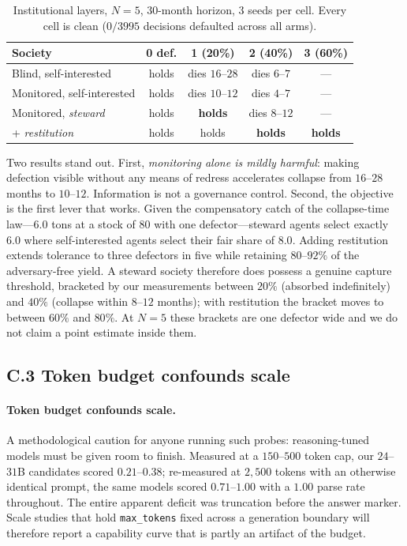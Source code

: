 \documentclass[11pt,a4paper]{article}
\begin{document}
\begin{table}[t]
\caption{Institutional layers, $N{=}5$, $30$-month horizon, 3 seeds per cell.
Every cell is clean ($0/3995$ decisions defaulted across all arms).}
\label{tab:arms}
\small
\begin{tabular}{@{}p{5.4cm}cccc@{}}
\toprule
\textbf{Society} & \textbf{0 def.} & \textbf{1 (20\%)} & \textbf{2 (40\%)} & \textbf{3 (60\%)} \\
\midrule
Blind, self-interested & holds & dies $16$--$28$ & dies $6$--$7$ & --- \\
Monitored, self-interested & holds & dies $10$--$12$ & dies $4$--$7$ & --- \\
Monitored, \emph{steward} & holds & \textbf{holds} & dies $8$--$12$ & --- \\
\;\;+ \emph{restitution} & holds & holds & \textbf{holds} & \textbf{holds} \\
\bottomrule
\end{tabular}
\end{table}

Two results stand out. First, \emph{monitoring alone is mildly harmful}: making
defection visible without any means of redress accelerates collapse from
$16$--$28$ months to $10$--$12$. Information is not a governance control. Second,
the objective is the first lever that works. Given the compensatory catch of
the collapse-time law---$6.0$ tons at a stock of $80$ with one defector---steward
agents select exactly $6.0$ where self-interested agents select their fair share
of $8.0$. Adding restitution extends tolerance to three defectors in five while
retaining $80$--$92\%$ of the adversary-free yield. A steward society therefore
does possess a genuine capture threshold, bracketed by our measurements between
$20\%$ (absorbed indefinitely) and $40\%$ (collapse within $8$--$12$ months);
with restitution the bracket moves to between $60\%$ and $80\%$. At $N{=}5$ these
brackets are one defector wide and we do not claim a point estimate inside them.

\subsection*{C.3 Token budget confounds scale}
\paragraph{Token budget confounds scale.} A methodological caution for anyone
running such probes: reasoning-tuned models must be given room to finish. Measured
at a $150$--$500$ token cap, our $24$--$31$B candidates scored $0.21$--$0.38$;
re-measured at $2{,}500$ tokens with an otherwise identical prompt, the same models
scored $0.71$--$1.00$ with a $1.00$ parse rate throughout. The entire apparent
deficit was truncation before the answer marker. Scale studies that hold
\texttt{max\_tokens} fixed across a generation boundary will therefore report a
capability curve that is partly an artifact of the budget.
\end{document}
